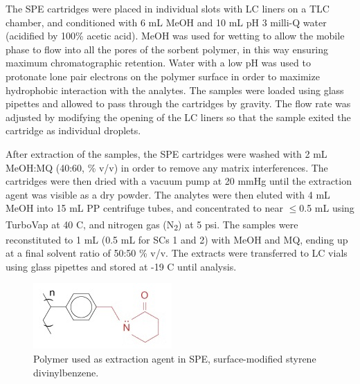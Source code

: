 The SPE cartridges were placed in individual slots with LC liners on a \acrshort{TLC} chamber, and conditioned with 6 mL \acrshort{MeOH} and 10 mL pH 3 milli-Q water (acidified by 100\% acetic acid). MeOH was used for wetting to allow the mobile phase to flow into all the pores of the sorbent polymer, in this way ensuring maximum chromatographic retention. Water with a low pH was used to protonate lone pair electrons on the polymer surface in order to maximize hydrophobic interaction with the analytes. The samples were loaded using glass pipettes and allowed to pass through the cartridges by gravity. The flow rate was adjusted by modifying the opening of the LC liners so that the sample exited the cartridge as individual droplets.

After extraction of the samples, the SPE cartridges were washed with 2 mL MeOH:\acrshort{MQ} (40:60, \% v/v) in order to remove any matrix interferences. The cartridges were then dried with a vacuum pump at 20 mmHg until the extraction agent was visible as a dry powder. The analytes were then eluted with 4 mL MeOH into 15 mL PP centrifuge tubes, and concentrated to near $\le$0.5 mL using TurboVap\textsuperscript{\textregistered} at 40 \textdegree C, and nitrogen gas (N\textsubscript{2}) at 5 psi. The samples were reconstituted to 1 mL (0.5 mL for SCs 1 and 2) with MeOH and MQ, ending up at a final solvent ratio of 50:50 \% v/v. The extracts were transferred to LC vials using glass pipettes and stored at -19 \textdegree C until analysis.

\begin{figure}
    \centering
    \includegraphics{Bilder/SPE_LCMS/mg_spe_strata-x.jpg}
    \caption{Polymer used as extraction agent in SPE, surface-modified styrene divinylbenzene.}
    \label{fig:StatPhase}
\end{figure}

